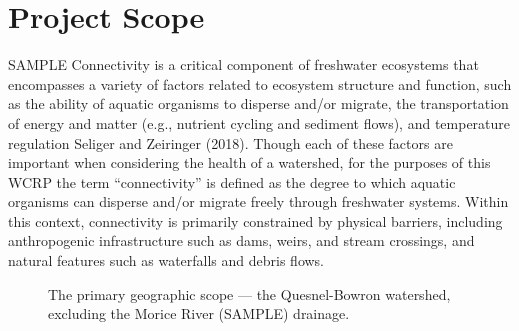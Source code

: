 \documentclass[
  letterpaper,
  DIV=11,
  numbers=noendperiod]{scrreprt}
\begin{document}
\section*{Project Scope}\label{project-scope}


SAMPLE Connectivity is a critical component of freshwater ecosystems
that encompasses a variety of factors related to ecosystem structure and
function, such as the ability of aquatic organisms to disperse and/or
migrate, the transportation of energy and matter (e.g., nutrient cycling
and sediment flows), and temperature regulation Seliger and Zeiringer
(2018). Though each of these factors are important when considering the
health of a watershed, for the purposes of this WCRP the term
``connectivity'' is defined as the degree to which aquatic organisms can
disperse and/or migrate freely through freshwater systems. Within this
context, connectivity is primarily constrained by physical barriers,
including anthropogenic infrastructure such as dams, weirs, and stream
crossings, and natural features such as waterfalls and debris flows.

\begin{figure}


\caption{\label{fig-geoscope}The primary geographic scope --- the
Quesnel-Bowron watershed, excluding the Morice River (SAMPLE) drainage.}

\end{figure}%
\end{document}
